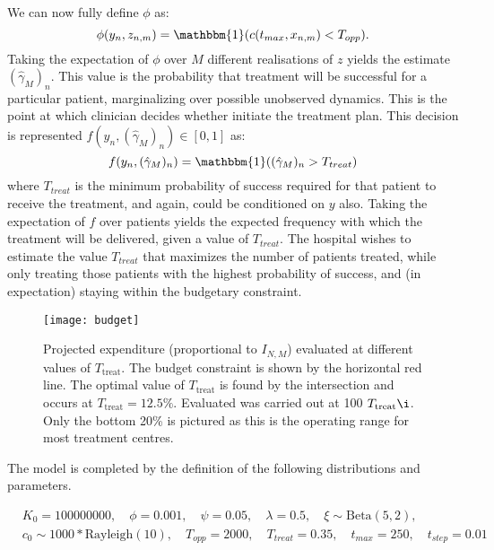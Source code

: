 We can now fully define $\phi$ as:
\begin{equation}
\phi(y_n,z_{n,m}) = \mathbbm{1}(c(t_{max}, x_{n,m})<T_{opp}).
\end{equation}
Taking the expectation of $\phi$ over $M$ different realisations of $z$ yields the estimate $(\hat{\gamma}_M)_n$. 
This value is the probability that treatment will be successful for a particular patient, marginalizing over possible unobserved dynamics. This is the point at which clinician decides whether initiate the treatment plan.
This decision is represented $f(y_n,(\hat{\gamma}_M)_n) \in [0,1]$ as:
\begin{equation}
f(y_n,(\hat{\gamma}_M)_n) = \mathbbm{1}((\hat{\gamma}_M)_n>T_{treat})
\end{equation}
where $T_{treat}$ is the minimum probability of success required for that patient to receive the treatment, and again, could be conditioned on $y$ also.
Taking the expectation of $f$ over patients yields the expected frequency with which the treatment will be delivered, given a value of $T_{treat}$. The hospital wishes to estimate the value $T_{treat}$ that maximizes the number of patients treated, while only treating those patients with the highest probability of success, and (in expectation) staying within the budgetary constraint.

\begin{figure}[t]
	\centering
	\texttt{[image: budget]}
	\caption{Projected expenditure (proportional to $I_{N,M}$) evaluated at different values of $T_{\mathrm{treat}}$. The budget constraint is shown by the horizontal red line. The optimal value of $T_{\mathrm{treat}}$ is found by the intersection 
		and occurs at $T_{\mathrm{treat}} = 12.5\%$. Evaluated was carried out at 100 $T_{\mathrm{treat}} \i$. Only the bottom 20\% is pictured as this is the operating range for most treatment centres. }
	\label{fig:emperical-cost}
\end{figure}

The model is completed by the definition of the following distributions and parameters.

\begin{align*}
& K_0 = 100000000, \quad
\phi = 0.001, \quad
\psi = 0.05, \quad
\lambda = 0.5, \quad
\xi \sim \text{Beta}(5, 2), \\
& c_0 \sim 1000*\text{Rayleigh}(10), \quad
T_{opp} = 2000,\quad
T_{treat} = 0.35, \quad
t_{max} = 250, \quad
t_{step} = 0.01 
\end{align*}

